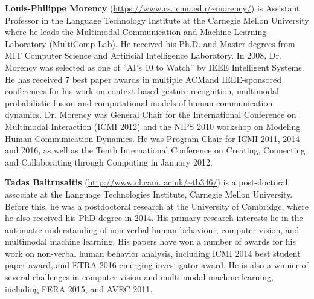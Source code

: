 \begin{bio}
  {\bfseries Louis-Philippe Morency} (\url{https://www.cs. cmu.edu/~morency/}) is Assistant Professor in the Language Technology Institute at the Carnegie Mellon University where he leads the Multimodal Communication and Machine Learning Laboratory (MultiComp Lab). He received his Ph.D. and Master degrees from MIT Computer Science and Artificial Intelligence Laboratory. In 2008, Dr. Morency was selected as one of ”AI’s 10 to Watch” by IEEE Intelligent Systems. He has received 7 best paper awards in multiple ACMand IEEE-sponsored conferences for his work on context-based gesture recognition, multimodal probabilistic fusion and computational models of human communication dynamics. Dr. Morency was General Chair for the International Conference on Multimodal Interaction (ICMI 2012) and the NIPS 2010 workshop on Modeling Human Communication Dynamics. He was Program Chair for ICMI 2011, 2014 and 2016, as well as the Tenth International Conference on Creating, Connecting and Collaborating through Computing in January 2012.
 
  {\bfseries Tadas Baltrusaitis} (\url{http://www.cl.cam. ac.uk/~tb346/}) is a post-doctoral associate at the Language Technologies Institute, Carnegie Mellon University. Before this, he was a postdoctoral research at the University of Cambridge, where he also received his PhD degree in 2014. His primary research interests lie in the automatic understanding of non-verbal human behaviour, computer vision, and multimodal machine learning. His papers have won a number of awards for his work on non-verbal human behavior analysis, including ICMI 2014 best student paper award, and ETRA 2016 emerging investigator award. He is also a winner of several challenges in computer vision and multi-modal machine learning, including FERA 2015, and AVEC 2011. 
\end{bio}

